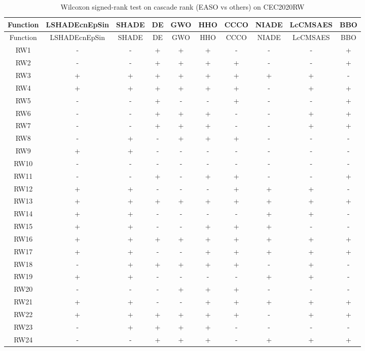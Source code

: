 \begin{center}
\small
\renewcommand{\arraystretch}{1.25}
\begin{longtable}{cccccccccc}
\caption{Wilcoxon signed-rank test on cascade rank (EASO vs others) on CEC2020RW }
\label{tab:wilcoxon_cascade_CEC2020RW} \\
\toprule
Function & LSHADEcnEpSin & SHADE & DE & GWO & HHO & CCCO & NIADE & LcCMSAES & BBO \\
\midrule
\endfirsthead
\toprule
Function & LSHADEcnEpSin & SHADE & DE & GWO & HHO & CCCO & NIADE & LcCMSAES & BBO \\
\midrule
\endhead
RW1 & - & - & + & + & + & - & - & - & + \\
RW2 & - & - & + & + & + & + & - & - & + \\
RW3 & + & + & + & + & + & + & + & + & - \\
RW4 & + & + & + & + & + & + & - & + & + \\
RW5 & - & - & + & - & - & + & - & - & + \\
RW6 & - & - & + & + & + & - & - & + & + \\
RW7 & - & - & + & + & + & - & - & + & + \\
RW8 & - & + & - & + & + & + & - & - & - \\
RW9 & + & + & - & - & - & - & - & - & - \\
RW10 & - & - & - & - & - & - & - & - & - \\
RW11 & - & - & + & - & + & + & - & - & + \\
RW12 & + & + & - & - & - & + & + & + & - \\
RW13 & + & + & + & + & + & + & + & + & + \\
RW14 & + & + & - & - & - & - & + & + & - \\
RW15 & + & + & - & - & + & + & + & - & - \\
RW16 & + & + & + & + & + & + & + & + & + \\
RW17 & + & + & - & - & + & + & + & + & + \\
RW18 & - & + & + & + & + & + & - & + & - \\
RW19 & + & + & - & - & - & - & + & + & - \\
RW20 & - & - & - & + & + & + & - & - & - \\
RW21 & + & + & - & - & + & + & + & + & + \\
RW22 & + & + & + & + & + & + & - & + & + \\
RW23 & - & + & + & + & + & - & - & - & - \\
RW24 & - & - & + & + & + & - & + & + & + \\

\end{longtable}
\end{center}
